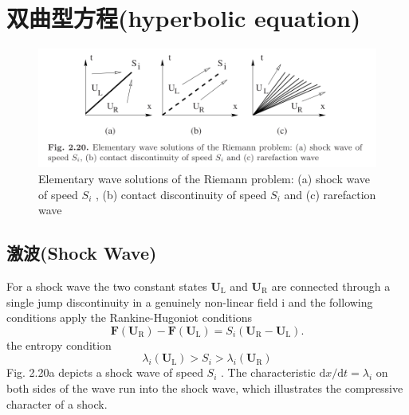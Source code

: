 \documentclass{book}
\begin{document}
\section{双曲型方程(hyperbolic equation)}
\begin{figure}[htp]
  \centering
  \label{fig:间断波}
  \includegraphics[width=0.7\linewidth]{fig/间断波.png}
  \caption{Elementary wave solutions of the Riemann problem: (a) shock wave of speed  $S_{i}$ , (b) contact discontinuity of speed  $S_{i}$  and (c) rarefaction wave}
\end{figure}

\subsection{激波(Shock Wave)}
For a shock wave the two constant states  $\mathbf{U}_{\mathrm{L}}$  and  $\mathbf{U}_{\mathrm{R}}$  are connected through a single jump discontinuity in a genuinely non-linear field  i  and the following conditions apply
the Rankine-Hugoniot conditions
\begin{equation}
  \mathbf{F}\left(\mathbf{U}_{\mathrm{R}}\right)-\mathbf{F}\left(\mathbf{U}_{\mathrm{L}}\right)=S_{i}\left(\mathbf{U}_{\mathrm{R}}-\mathbf{U}_{\mathrm{L}}\right) .
\end{equation}
the entropy condition
\begin{equation}
  \lambda_{i}\left(\mathbf{U}_{\mathrm{L}}\right)>S_{i}>\lambda_{i}\left(\mathbf{U}_{\mathrm{R}}\right)
\end{equation}
Fig. 2.20a depicts a shock wave of speed  $S_{i}$ . The characteristic  $\mathrm{d} x / \mathrm{d} t=\lambda_{i}$  on both sides of the wave run into the shock wave, which illustrates the compressive character of a shock.
\end{document}
